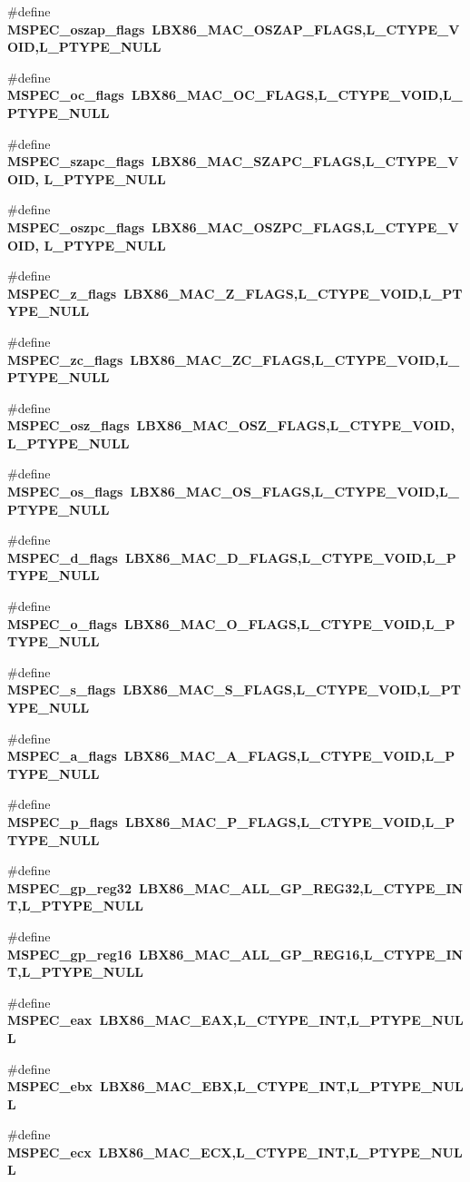 \begin{CompactItemize}
\item 
\#define \bf{MSPEC\_\-oszap\_\-flags}~LBX86\_\-MAC\_\-OSZAP\_\-FLAGS,L\_\-CTYPE\_\-VOID,L\_\-PTYPE\_\-NULL
\item 
\#define \bf{MSPEC\_\-oc\_\-flags}~LBX86\_\-MAC\_\-OC\_\-FLAGS,L\_\-CTYPE\_\-VOID,L\_\-PTYPE\_\-NULL
\item 
\#define \bf{MSPEC\_\-szapc\_\-flags}~LBX86\_\-MAC\_\-SZAPC\_\-FLAGS,L\_\-CTYPE\_\-VOID, L\_\-PTYPE\_\-NULL
\item 
\#define \bf{MSPEC\_\-oszpc\_\-flags}~LBX86\_\-MAC\_\-OSZPC\_\-FLAGS,L\_\-CTYPE\_\-VOID, L\_\-PTYPE\_\-NULL
\item 
\#define \bf{MSPEC\_\-z\_\-flags}~LBX86\_\-MAC\_\-Z\_\-FLAGS,L\_\-CTYPE\_\-VOID,L\_\-PTYPE\_\-NULL
\item 
\#define \bf{MSPEC\_\-zc\_\-flags}~LBX86\_\-MAC\_\-ZC\_\-FLAGS,L\_\-CTYPE\_\-VOID,L\_\-PTYPE\_\-NULL
\item 
\#define \bf{MSPEC\_\-osz\_\-flags}~LBX86\_\-MAC\_\-OSZ\_\-FLAGS,L\_\-CTYPE\_\-VOID, L\_\-PTYPE\_\-NULL
\item 
\#define \bf{MSPEC\_\-os\_\-flags}~LBX86\_\-MAC\_\-OS\_\-FLAGS,L\_\-CTYPE\_\-VOID,L\_\-PTYPE\_\-NULL
\item 
\#define \bf{MSPEC\_\-d\_\-flags}~LBX86\_\-MAC\_\-D\_\-FLAGS,L\_\-CTYPE\_\-VOID,L\_\-PTYPE\_\-NULL
\item 
\#define \bf{MSPEC\_\-o\_\-flags}~LBX86\_\-MAC\_\-O\_\-FLAGS,L\_\-CTYPE\_\-VOID,L\_\-PTYPE\_\-NULL
\item 
\#define \bf{MSPEC\_\-s\_\-flags}~LBX86\_\-MAC\_\-S\_\-FLAGS,L\_\-CTYPE\_\-VOID,L\_\-PTYPE\_\-NULL
\item 
\#define \bf{MSPEC\_\-a\_\-flags}~LBX86\_\-MAC\_\-A\_\-FLAGS,L\_\-CTYPE\_\-VOID,L\_\-PTYPE\_\-NULL
\item 
\#define \bf{MSPEC\_\-p\_\-flags}~LBX86\_\-MAC\_\-P\_\-FLAGS,L\_\-CTYPE\_\-VOID,L\_\-PTYPE\_\-NULL
\item 
\#define \bf{MSPEC\_\-gp\_\-reg32}~LBX86\_\-MAC\_\-ALL\_\-GP\_\-REG32,L\_\-CTYPE\_\-INT,L\_\-PTYPE\_\-NULL
\item 
\#define \bf{MSPEC\_\-gp\_\-reg16}~LBX86\_\-MAC\_\-ALL\_\-GP\_\-REG16,L\_\-CTYPE\_\-INT,L\_\-PTYPE\_\-NULL
\item 
\#define \bf{MSPEC\_\-eax}~LBX86\_\-MAC\_\-EAX,L\_\-CTYPE\_\-INT,L\_\-PTYPE\_\-NULL
\item 
\#define \bf{MSPEC\_\-ebx}~LBX86\_\-MAC\_\-EBX,L\_\-CTYPE\_\-INT,L\_\-PTYPE\_\-NULL
\item 
\#define \bf{MSPEC\_\-ecx}~LBX86\_\-MAC\_\-ECX,L\_\-CTYPE\_\-INT,L\_\-PTYPE\_\-NULL

\end{CompactItemize}
